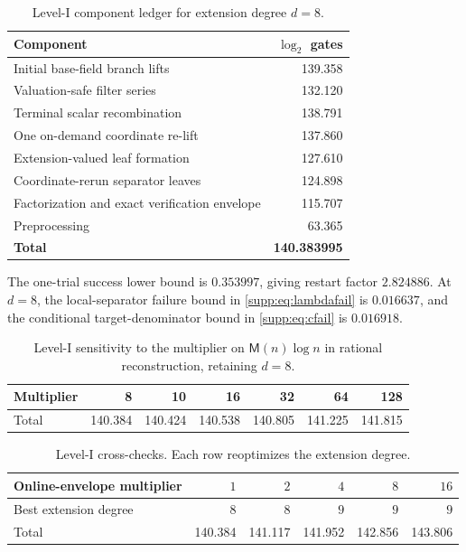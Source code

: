 \documentclass[11pt,a4paper]{article}
\theoremstyle{definition}
\theoremstyle{remark}
\newcommand{\M}{\mathsf M}
\begin{document}
\begin{table}[ht]
\centering
\caption{Level-I component ledger for extension degree $d=8$.}
\label{supp:tab:components}
\begin{tabularx}{0.88\textwidth}{@{}Xr@{}}
\toprule
Component & $\log_2$ gates\\
\midrule
Initial base-field branch lifts & 139.358\\
Valuation-safe filter series & 132.120\\
Terminal scalar recombination & 138.791\\
One on-demand coordinate re-lift & 137.860\\
Extension-valued leaf formation & 127.610\\
Coordinate-rerun separator leaves & 124.898\\
Factorization and exact verification envelope & 115.707\\
Preprocessing & 63.365\\
\midrule
\textbf{Total} & \textbf{140.383995}\\
\bottomrule
\end{tabularx}
\end{table}

The one-trial success lower bound is $0.353997$, giving restart factor $2.824886$.  At $d=8$, the local-separator failure bound in \eqref{supp:eq:lambdafail} is $0.016637$, and the conditional target-denominator bound in \eqref{supp:eq:cfail} is $0.016918$.

\begin{table}[ht]
\centering
\caption{Level-I sensitivity to the multiplier on $\M(n)\log n$ in rational reconstruction, retaining $d=8$.}
\label{supp:tab:sensitivity}
\begin{tabular}{@{}lrrrrrr@{}}
\toprule
Multiplier & 8 & 10 & 16 & 32 & 64 & 128\\
\midrule
Total & 140.384 & 140.424 & 140.538 & 140.805 & 141.225 & 141.815\\
\bottomrule
\end{tabular}
\end{table}

\begin{table}[H]
\centering
\caption{Level-I cross-checks.  Each row reoptimizes the extension degree.}
\label{supp:tab:robustness}
\begin{tabularx}{\textwidth}{@{}Xrrrrr@{}}
\toprule
Online-envelope multiplier & $1$ & $2$ & $4$ & $8$ & $16$\\
\midrule
Best extension degree & $8$ & $8$ & $9$ & $9$ & $9$\\
Total & 140.384 & 141.117 & 141.952 & 142.856 & 143.806\\
\bottomrule
\end{tabularx}
\end{table}
\end{document}
